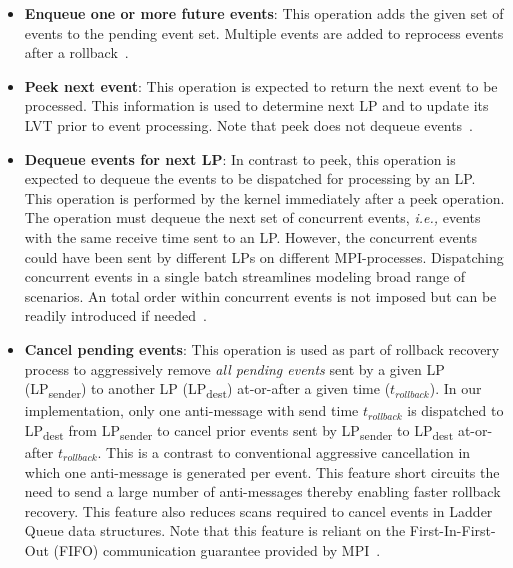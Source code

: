 \begin{itemize}
\item[\ding{182}] \textbf{Enqueue one or more future events}: This operation adds the given set of events to the pending event set. Multiple events are added to reprocess events after a rollback~\cite{higiro2017multi}.	 

\item[\ding{183}] \textbf{Peek next event}: This operation is expected to return the next event to be processed.  This information is used to determine next LP and to update its LVT prior to event processing. Note that peek does not dequeue events~\cite{higiro2017multi}.

\item[\ding{184}] \textbf{Dequeue events for next LP}: In contrast to peek, this operation is expected to dequeue the events to be dispatched for processing by an LP. This operation is performed by the kernel immediately after a peek operation. The operation must dequeue the next set of concurrent events, \textit{i.e.,} events with the same receive time sent to an LP. However, the concurrent events could have been sent by different LPs on different MPI-processes.
Dispatching concurrent events in a single batch streamlines modeling broad range of scenarios. An total order within concurrent events is not imposed but can be readily introduced if needed~\cite{higiro2017multi}.	

\item[\ding{185}] \textbf{Cancel pending events}: This operation is used as part of rollback recovery process to aggressively remove \emph{all pending events} sent by a given LP (LP\textsubscript{sender}) to another LP (LP\textsubscript{dest}) at-or-after a given time ($t_{rollback}$). In our implementation, only one anti-message with send time $t_{rollback}$ is dispatched to LP\textsubscript{dest} from LP\textsubscript{sender} to cancel prior events sent by LP\textsubscript{sender} to LP\textsubscript{dest} at-or-after $t_{rollback}$. This is a contrast to conventional aggressive cancellation in which one anti-message is generated per event. This feature short circuits the need to send a large number of anti-messages thereby enabling faster rollback recovery. This feature also reduces scans required to cancel events in Ladder Queue data structures. Note that this feature is reliant on the First-In-First-Out (FIFO) communication guarantee provided by MPI~\cite{higiro2017multi}.
\end{itemize}   


